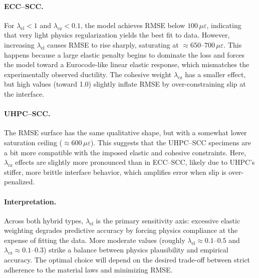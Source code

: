 \documentclass{article}
\begin{document}
\paragraph{ECC–SCC.} For $\lambda_{\text{el}} < 1$ and $\lambda_{\text{cz}} < 0.1$, the model achieves RMSE below $100\,\mu\varepsilon$, indicating that very light physics regularization yields the best fit to data. However, increasing $\lambda_{\text{el}}$ causes RMSE to rise sharply, saturating at $\approx 650$–$700\,\mu\varepsilon$. This happens because a large elastic penalty begins to dominate the loss and forces the model toward a Eurocode-like linear elastic response, which mismatches the experimentally observed ductility. The cohesive weight $\lambda_{\text{cz}}$ has a smaller effect, but high values (toward 1.0) slightly inflate RMSE by over-constraining slip at the interface.

\paragraph{UHPC–SCC.} The RMSE surface has the same qualitative shape, but with a somewhat lower saturation ceiling ($\approx 600\,\mu\varepsilon$). This suggests that the UHPC–SCC specimens are a bit more compatible with the imposed elastic and cohesive constraints. Here, $\lambda_{\text{cz}}$ effects are slightly more pronounced than in ECC–SCC, likely due to UHPC’s stiffer, more brittle interface behavior, which amplifies error when slip is over-penalized.

\paragraph{Interpretation.} Across both hybrid types, $\lambda_{\text{el}}$ is the primary sensitivity axis: excessive elastic weighting degrades predictive accuracy by forcing physics compliance at the expense of fitting the data. More moderate values (roughly $\lambda_{\text{el}} \approx 0.1$–$0.5$ and $\lambda_{\text{cz}} \approx 0.1$–$0.3$) strike a balance between physics plausibility and empirical accuracy. The optimal choice will depend on the desired trade-off between strict adherence to the material laws and minimizing RMSE.
\end{document}
